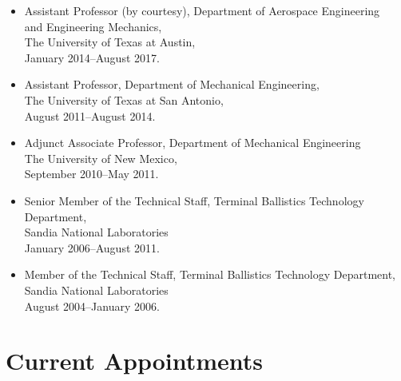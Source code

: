 \begin{itemize}
    \item Assistant Professor (by courtesy), Department of Aerospace Engineering \\ 
          and Engineering Mechanics, \\ 
          The University of Texas at Austin, \\
          January 2014--August 2017. 

    \item Assistant Professor, Department of Mechanical Engineering, \\ 
          The University of Texas at San Antonio,\\
          August 2011--August 2014. 

    \item Adjunct Associate Professor, Department of Mechanical Engineering \\
          The University of New Mexico, \\ 
          September 2010--May 2011.

    \item Senior Member of the Technical Staff, Terminal Ballistics Technology Department, \\ 
          Sandia National Laboratories \\
          January 2006--August 2011.

    \item Member of the Technical Staff, Terminal Ballistics Technology Department, \\ 
          Sandia National Laboratories\\
          August 2004--January 2006.
\end{itemize}
\else
\section*{Current Appointments}

